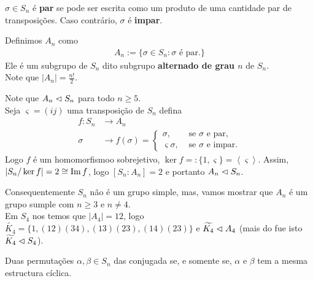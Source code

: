 \begin{definition}
  $\sigma\in S_n$ é \textbf{par} se pode ser escrita como um produto de uma cantidade par de transposições. Caso contrário, $\sigma$ é \textbf{impar}. 
\end{definition}
\begin{definition}[$A_n$]
  Definimos $A_n$ como
  \begin{align*}
    A_n:=\{\sigma\in S_n:\sigma\text{ é par.}\}
  \end{align*}
  Ele é um subgrupo de $S_n$ dito subgrupo \textbf{alternado de grau $n$} de $S_n$.\\
  Note que $|A_n|=\frac{n!}{2}$.
\end{definition}
\begin{note}[$A_n\normal S_n$]
  Note que $A_n\normal S_n$ para todo $n\geq 5$.\\
  Seja $\varsigma=(ij)$ uma transposição de $S_n$ defina
  \begin{align*}
    f:S_n&\to A_n\\
    \sigma&\to f(\sigma)= 
    \begin{cases}
      \sigma, &\text{ se } \sigma\text{ e par} \text{,} \\
      \varsigma\sigma, &\text{ se } \sigma\text{ e impar} .
    \end{cases}
  \end{align*}
  Logo $f$ é um homomorfismoo sobrejetivo, $\ker f=:\{1,\varsigma\}=\left\langle \varsigma \right\rangle$. Assim, $|S_n/\ker f|=2\cong \operatorname{Im} f$, logo $[S_n:A_n]=2$ e portanto $A_n\normal S_n$. 
\end{note}
Consequentemente $S_n$ não é um grupo simple, mas, vamos mostrar que $A_n$ é um grupo sumple com $n\geq 3$ e $n\neq 4$.\\ 
Em $S_4$ nos temos que $|A_4|=12$, logo $\tilde{K_4}=\{1,(12)(34),(13)(23),(14)(23)\}$ e $\widetilde{K_4}\vartriangleleft A_4$ (mais do fue isto $\widetilde{K_4}\vartriangleleft S_4$).
\begin{proposition}
  Duas permutações $\alpha,\beta\in S_n$ das conjugada se, e somente se, $\alpha$ e $\beta$ tem a mesma estructura cíclica.
\end{proposition}
